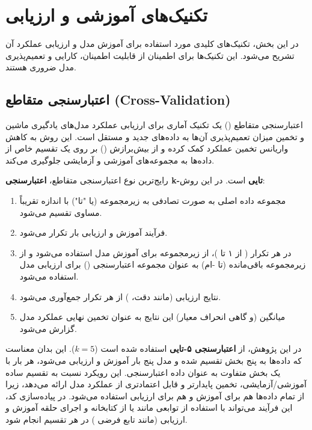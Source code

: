 \section{تکنیک‌های آموزشی و ارزیابی}
در این بخش، تکنیک‌های کلیدی مورد استفاده برای آموزش مدل  و ارزیابی عملکرد آن تشریح می‌شود. این تکنیک‌ها برای اطمینان از قابلیت اطمینان، کارایی و تعمیم‌پذیری مدل ضروری هستند.

\subsection{اعتبارسنجی متقاطع (Cross-Validation)}
اعتبارسنجی متقاطع () یک تکنیک آماری برای ارزیابی عملکرد مدل‌های یادگیری ماشین و تخمین میزان تعمیم‌پذیری آن‌ها به داده‌های جدید و مستقل است. این روش به کاهش واریانس تخمین عملکرد کمک کرده و از بیش‌برازش () بر روی یک تقسیم خاص از داده‌ها به مجموعه‌های آموزشی و آزمایشی جلوگیری می‌کند.

رایج‌ترین نوع اعتبارسنجی متقاطع، \textbf{اعتبارسنجی {k-تایی} } است. در این روش:
\begin{enumerate}
    \item مجموعه داده اصلی به صورت تصادفی به  زیرمجموعه (یا "تا") با اندازه تقریباً مساوی تقسیم می‌شود.
    \item فرآیند آموزش و ارزیابی  بار تکرار می‌شود.
    \item در هر تکرار ( از ۱ تا )، از  زیرمجموعه برای آموزش مدل استفاده می‌شود و از زیرمجموعه باقی‌مانده (تا -ام) به عنوان مجموعه اعتبارسنجی () برای ارزیابی مدل استفاده می‌شود.
    \item نتایج ارزیابی (مانند دقت، ) از هر  تکرار جمع‌آوری می‌شود.
    \item میانگین (و گاهی انحراف معیار) این نتایج به عنوان تخمین نهایی عملکرد مدل گزارش می‌شود.
\end{enumerate}
در این پژوهش، از \textbf{اعتبارسنجی ۵-تایی } استفاده شده است (\(k=5\)). این بدان معناست که داده‌ها به پنج بخش تقسیم شده و مدل پنج بار آموزش و ارزیابی می‌شود، هر بار با یک بخش متفاوت به عنوان داده اعتبارسنجی. این رویکرد نسبت به تقسیم ساده آموزشی/آزمایشی، تخمین پایدارتر و قابل اعتمادتری از عملکرد مدل ارائه می‌دهد، زیرا از تمام داده‌ها هم برای آموزش و هم برای ارزیابی استفاده می‌شود. در پیاده‌سازی کد، این فرآیند می‌تواند با استفاده از توابعی مانند  یا  از کتابخانه  و اجرای حلقه آموزش و ارزیابی (مانند تابع فرضی ) در هر تقسیم انجام شود.

